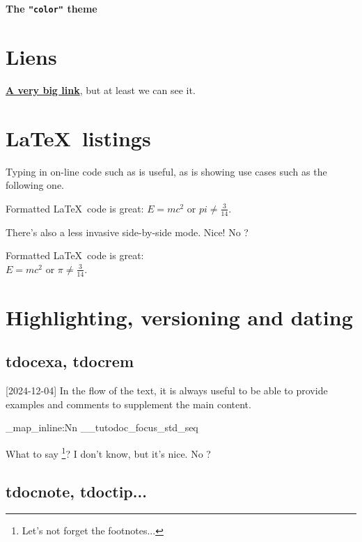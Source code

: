 \documentclass[theme = color]{tutodoc}
\newcommand\thisstyle{color}
\newcommand\myexrmktext{
    \tdocversion{1.7.0}[2024-12-04]
    In the flow of the text, it is always useful to be able to provide examples and comments to supplement the main content.
}
\newcommand\myhighlightedtext{
    What to say
    \footnote{
        Let's not forget the footnotes...
    }?
    I don't know, but it's nice. No ?
}
\begin{document}
\textsf{\Huge\bfseries The \texttt{"\thisstyle"} theme}

\section{Liens}

{\Large\bfseries \href{https://github.com/bc-tools/for-latex/tree/main/tutodoc}{A very big link}}, but at least we can see it.



\section{\LaTeX\ listings}

Typing in on-line code such as  is useful, as is showing use cases such as the following one.

\begin{tdoclatex}
Formatted \LaTeX\ code is great: $E = m c^2$ or $pi \neq \frac{3}{14}$.
\end{tdoclatex}


There's also a less invasive side-by-side mode. Nice! No ?

\begin{tdoclatex}[sbs]
Formatted \LaTeX\ code is great:       \\
$E = m c^2$ or $\pi \neq \frac{3}{14}$.
\end{tdoclatex}



\section{Highlighting, versioning and dating}

\subsection{tdocexa, tdocrem}

\myexrmktext

\ExplSyntaxOn

\seq_map_inline:Nn \g__tutodoc_focus_std_seq {
    \begin{tdoc#1}
        \myhighlightedtext
    \end{tdoc#1}
}

\ExplSyntaxOff



\subsection{tdocnote, tdoctip...}
\end{document}
